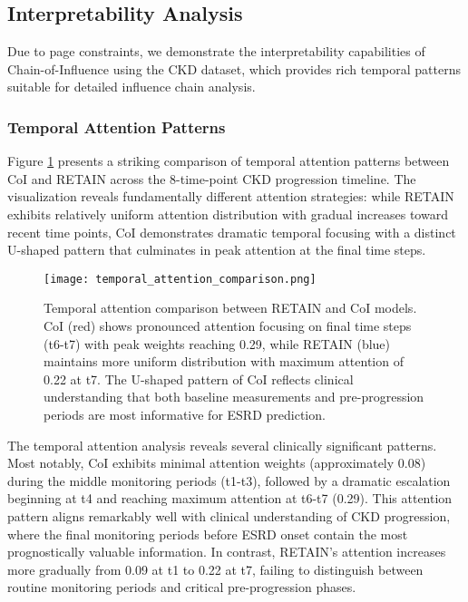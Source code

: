 \documentclass[letterpaper]{article}
\begin{document}
\begin{enumerate}
\subsection{Interpretability Analysis}

Due to page constraints, we demonstrate the interpretability capabilities of Chain-of-Influence using the CKD dataset, which provides rich temporal patterns suitable for detailed influence chain analysis.

\subsubsection{Temporal Attention Patterns}

Figure \ref{fig:temporal_attention} presents a striking comparison of temporal attention patterns between CoI and RETAIN across the 8-time-point CKD progression timeline. The visualization reveals fundamentally different attention strategies: while RETAIN exhibits relatively uniform attention distribution with gradual increases toward recent time points, CoI demonstrates dramatic temporal focusing with a distinct U-shaped pattern that culminates in peak attention at the final time steps.

\begin{figure}[htbp]
\centering
\texttt{[image: temporal\_attention\_comparison.png]}
\caption{Temporal attention comparison between RETAIN and CoI models. CoI (red) shows pronounced attention focusing on final time steps (t6-t7) with peak weights reaching 0.29, while RETAIN (blue) maintains more uniform distribution with maximum attention of 0.22 at t7. The U-shaped pattern of CoI reflects clinical understanding that both baseline measurements and pre-progression periods are most informative for ESRD prediction.}
\label{fig:temporal_attention}
\end{figure}

The temporal attention analysis reveals several clinically significant patterns. Most notably, CoI exhibits minimal attention weights (approximately 0.08) during the middle monitoring periods (t1-t3), followed by a dramatic escalation beginning at t4 and reaching maximum attention at t6-t7 (0.29). This attention pattern aligns remarkably well with clinical understanding of CKD progression, where the final monitoring periods before ESRD onset contain the most prognostically valuable information. In contrast, RETAIN's attention increases more gradually from 0.09 at t1 to 0.22 at t7, failing to distinguish between routine monitoring periods and critical pre-progression phases.


\end{enumerate}
\end{document}
